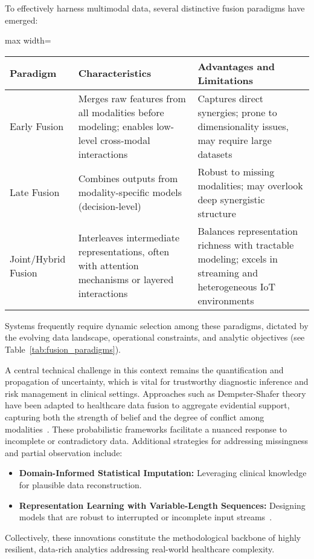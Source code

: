 \documentclass[sigconf]{acmart}
\begin{document}
To effectively harness multimodal data, several distinctive fusion paradigms have emerged:
\begin{table*}[htbp]
\centering
\caption{Comparison of Multimodal Data Fusion Paradigms}
\label{tab:fusion_paradigms}
\begin{adjustbox}{max width=\textwidth}
\begin{tabular}{lll}
\toprule
\textbf{Paradigm} & \textbf{Characteristics} & \textbf{Advantages and Limitations} \\
\midrule
Early Fusion & Merges raw features from all modalities before modeling; enables low-level cross-modal interactions & Captures direct synergies; prone to dimensionality issues, may require large datasets \\
Late Fusion & Combines outputs from modality-specific models (decision-level) & Robust to missing modalities; may overlook deep synergistic structure \\
Joint/Hybrid Fusion & Interleaves intermediate representations, often with attention mechanisms or layered interactions & Balances representation richness with tractable modeling; excels in streaming and heterogeneous IoT environments \\
\bottomrule
\end{tabular}
\end{adjustbox}
\end{table*}

Systems frequently require dynamic selection among these paradigms, dictated by the evolving data landscape, operational constraints, and analytic objectives (see Table~\ref{tab:fusion_paradigms}). 

A central technical challenge in this context remains the quantification and propagation of uncertainty, which is vital for trustworthy diagnostic inference and risk management in clinical settings. Approaches such as Dempster-Shafer theory have been adapted to healthcare data fusion to aggregate evidential support, capturing both the strength of belief and the degree of conflict among modalities~\cite{ref73}. These probabilistic frameworks facilitate a nuanced response to incomplete or contradictory data. Additional strategies for addressing missingness and partial observation include:
\begin{itemize}
    \item \textbf{Domain-Informed Statistical Imputation:} Leveraging clinical knowledge for plausible data reconstruction.
    \item \textbf{Representation Learning with Variable-Length Sequences:} Designing models that are robust to interrupted or incomplete input streams~\cite{ref76,ref77,ref84,ref89,ref90}.
\end{itemize}
Collectively, these innovations constitute the methodological backbone of highly resilient, data-rich analytics addressing real-world healthcare complexity.
\end{document}
